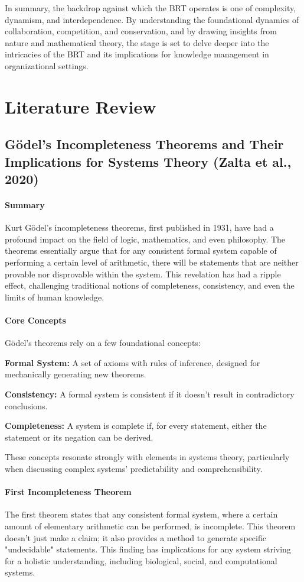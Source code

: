 \documentclass[sn-nature]{sn-jnl}%
\theoremstyle{thmstyleone}%
\theoremstyle{thmstyletwo}%
\theoremstyle{thmstylethree}%
\begin{document}
In summary, the backdrop against which the BRT operates is one of complexity, dynamism, and interdependence. By understanding the foundational dynamics of collaboration, competition, and conservation, and by drawing insights from nature and mathematical theory, the stage is set to delve deeper into the intricacies of the BRT and its implications for knowledge management in organizational settings.
\section{Literature Review}
\subsection{Gödel's Incompleteness Theorems and Their Implications for Systems Theory (Zalta et al., 2020)\cite{zalta_gos_2020}}
\paragraph{Summary}
Kurt Gödel's incompleteness theorems, first published in 1931, have had a profound impact on the field of logic, mathematics, and even philosophy. The theorems essentially argue that for any consistent formal system capable of performing a certain level of arithmetic, there will be statements that are neither provable nor disprovable within the system. This revelation has had a ripple effect, challenging traditional notions of completeness, consistency, and even the limits of human knowledge.

\paragraph{Core Concepts}
Gödel’s theorems rely on a few foundational concepts:

\textbf{Formal System:} A set of axioms with rules of inference, designed for mechanically generating new theorems.

\textbf{Consistency:} A formal system is consistent if it doesn't result in contradictory conclusions.

\textbf{Completeness:} A system is complete if, for every statement, either the statement or its negation can be derived.

These concepts resonate strongly with elements in systems theory, particularly when discussing complex systems' predictability and comprehensibility.

\paragraph{First Incompleteness Theorem}
The first theorem states that any consistent formal system, where a certain amount of elementary arithmetic can be performed, is incomplete. This theorem doesn't just make a claim; it also provides a method to generate specific "undecidable" statements. This finding has implications for any system striving for a holistic understanding, including biological, social, and computational systems.
\end{document}
